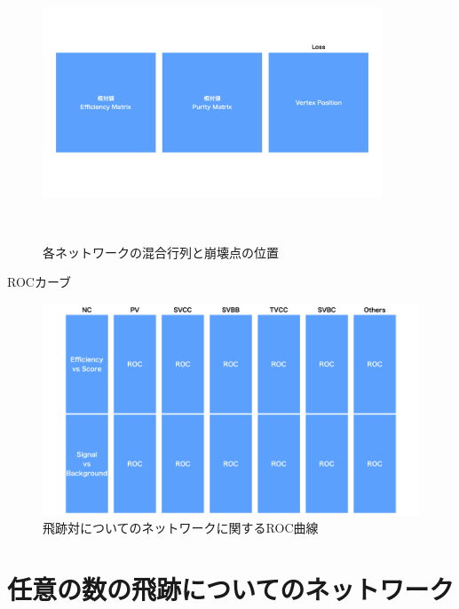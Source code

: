 \begin{figure}[h]
   \begin{minipage}{1.0\textwidth}
   \centering
    \includegraphics[trim = 0 220 0 220, width=0.9\textwidth, clip]{Figure/3Networks/3-3-3-2ConfusionMatrixD.png}
    \label{3-3-3-2ConfusionMatrixD}
   \end{minipage}
  \caption{各ネットワークの混合行列と崩壊点の位置}
  \label{3-3-3-2ConfusionMatrices}
\end{figure}

ROCカーブ\\

\begin{figure}[h]
 \centering
 \includegraphics[width=1.0\textwidth]{Figure/3Networks/3-3-3-3ROCCurve.png}
 \caption{飛跡対についてのネットワークに関するROC曲線}
 \label{3-3-3-3ROCCurve}
\end{figure}



\section{任意の数の飛跡についてのネットワーク} \label{Net:VertexLSTM}

